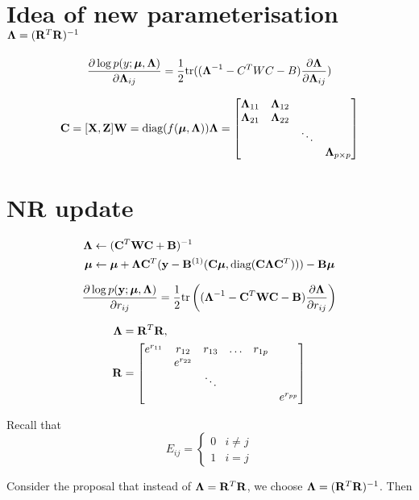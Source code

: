 \documentclass{article}[12pt]
\begin{document}
\section{Idea of new parameterisation ${\boldsymbol \Lambda} = ({\bf R}^T {\bf R})^{-1}$}
\begin{equation*}
\frac{\partial \log p(y;{\boldsymbol \mu}, {\boldsymbol \Lambda})}{\partial {\boldsymbol\Lambda}_{ij}} = {\frac{1}{2}} \text{tr} (({\boldsymbol \Lambda}^{-1} - C^T W C - B)\frac{\partial {\boldsymbol\Lambda}}{\partial {\boldsymbol\Lambda}_{ij}})
\end{equation*}

$$
{\bf C} = [{\bf X}, {\bf Z}]
{\bf W} = \text{diag}(f({\boldsymbol \mu}, {\boldsymbol \Lambda}))
{\boldsymbol \Lambda} = \begin{bmatrix}
{\boldsymbol\Lambda}_{11} & {\boldsymbol \Lambda}_{12} &  &\\
{\boldsymbol \Lambda}_{21} & {\boldsymbol \Lambda}_{22} &  &\\
& & \ddots & \\
& & & {\boldsymbol \Lambda}_{p \times p}
\end{bmatrix}
$$

\section{NR update}
\begin{align*}
{\boldsymbol\Lambda} &\leftarrow ({\bf C}^T {\bf W} {\bf C} + {\bf B})^{-1} \\
{\boldsymbol \mu} &\leftarrow {\boldsymbol\mu} + {\boldsymbol \Lambda} {\bf C}^T ({\bf y} - {\bf B}^{(1)}({\bf C}{\boldsymbol \mu}, \text{diag} ({\bf C} {\boldsymbol \Lambda} {\bf C}^T))) - {\bf B} {\boldsymbol \mu}
\end{align*}

$$
\frac{\partial \log p ({\bf y};{\boldsymbol \mu}, {\boldsymbol \Lambda})}{\partial r_{ij}} = {\frac{1}{2}} \text{tr} \left (({\boldsymbol \Lambda}^{-1} - {\bf C}^T {\bf W} {\bf C} - {\bf B}) \frac{\partial {\boldsymbol\Lambda}}{\partial r_{ij}} \right )
$$

\begin{align*}
{\boldsymbol\Lambda} &= {\bf R}^T {\bf R}, \\
{\bf R} &= \begin{bmatrix}
e^{r_{11}} & r_{12} & r_{13} & \dots & r_{1p} \\
& e^{r_{22}} & & & & \\
&  & \ddots & & & \\
&  & & & & e^{r_{pp}}\\
\end{bmatrix}
\end{align*}

Recall that
$$E_{ij} =
\begin{cases}
0 & i \ne j \\
1 & i = j
\end{cases}
$$

Consider the proposal that instead of ${\boldsymbol \Lambda} = {\bf R}^T {\bf R}$, we choose
${\boldsymbol \Lambda} = ({\bf R}^T {\bf R})^{-1}$. Then
\end{document}

